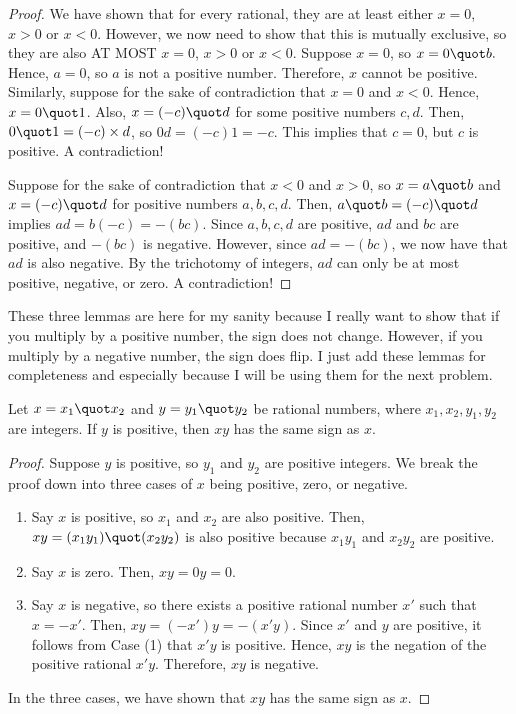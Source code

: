 \begin{proof}
    We have shown that for every rational, they are at least either $x =0$, $x > 0$ or $x < 0.$ 
    However, we now need to show that this is mutually exclusive, so they are also AT MOST $x =0$, $x > 0$ or $x < 0.$ 
    Suppose $x = 0$, so $x = 0 \quot b.$ 
    Hence, $a = 0$, so $a$ is not a positive number. Therefore, $x$ cannot be positive.
    Similarly, suppose for the sake of contradiction that $x = 0$ and $x < 0$. Hence, $x = 0 \quot 1$.
    Also, $x = (-c) \quot d$ for some positive numbers $c, d$. Then, $0 \quot 1 = (-c) \times d$, so $0d = (-c)1 = -c$.
    This implies that $c = 0$, but $c$ is positive. A contradiction!

    Suppose for the sake of contradiction that $x < 0$ and $x > 0$, so 
    $x = a \quot b$ and $x = (-c) \quot d$ for positive numbers $a, b, c, d.$
    Then, $a \quot b = (-c) \quot d$ implies $ad = b(-c) = -(bc)$.
    Since $a, b, c, d$ are positive, $ad$ and $bc$ are positive, and $-(bc)$ is negative. 
    However, since $ad = -(bc)$, we now have that $ad$ is also negative.
    By the trichotomy of integers, $ad$ can only be at most positive, negative, or zero. A contradiction!
    
\end{proof}

These three lemmas are here for my sanity because I really want to show that if you multiply by a positive number, the sign does not change.
However, if you multiply by a negative number, the sign does flip.
I just add these lemmas for completeness and especially because I will be using them for the next problem.

\begin{lemma}\label{lem: preservation_mul_positive}
    Let $x = x_1 \quot x_2$ and $y = y_1 \quot y_2$ be rational numbers, where $x_1, x_2, y_1, y_2$ are integers. 
    If $y$ is positive, then $xy$ has the same sign as $x$.
\end{lemma}
\begin{proof}
    Suppose $y$ is positive, so $y_1$ and $y_2$ are positive integers.
    We break the proof down into three cases of $x$ being positive, zero, or negative.
    \begin{enumerate}
        \item Say $x$ is positive, so $x_1$ and $x_2$ are also positive. 
        Then, $xy = (x_1 y_1) \quot (x_2 y_2)$ is also positive because $x_1 y_1$ and $x_2 y_2$ are positive.
        \item Say $x$ is zero. Then, $xy = 0y = 0.$
        \item Say $x$ is negative, so there exists a positive rational number $x'$ such that $x = -x'.$ 
        Then, $xy = (-x')y= -(x'y).$ Since $x'$ and $y$ are positive, it follows from Case (1) that $x'y$ is positive. 
        Hence, $xy$ is the negation of the positive rational $x'y$.
        Therefore, $xy$ is negative.
    \end{enumerate}
    In the three cases, we have shown that $xy$ has the same sign as $x$.
\end{proof}

